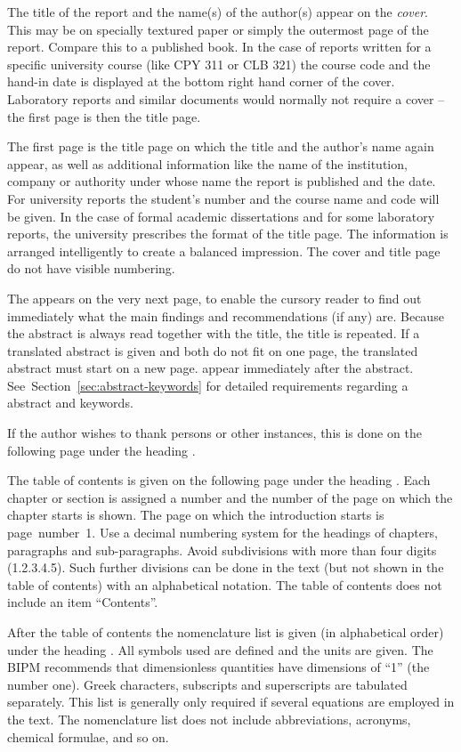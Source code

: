 \documentclass[a5paper, 10pt]{article}
\begin{document}
The title of the report and the name(s) of the author(s) appear on the
\emph{cover}. This may be on specially textured paper or simply the
outermost page of the report.  Compare this to a published book.  In
the case of reports written for a specific university course (like CPY
311 or CLB 321) the course code and the hand-in date is displayed at
the bottom right hand corner of the cover.  Laboratory reports and
similar documents would normally not require a cover -- the first page
is then the title page.

The first page is the title page on which the title and the author's
name again appear, as well as additional information like the name of
the institution, company or authority under whose name the report is
published and the date.  For university reports the student's number
and the course name and code will be given.  In the case of formal
academic dissertations and for some laboratory reports, the university
prescribes the format of the title page.  The information is arranged
intelligently to create a balanced impression.  The cover and title
page do not have visible numbering.

The  appears on the very next page, to enable
the cursory reader to find out immediately what the main findings and
recommendations (if any) are.  Because the abstract is always read
together with the title, the title is repeated.  If a translated
abstract is given and both do not fit on one page, the translated
abstract must start on a new page.
 appear immediately after
the abstract.  See~Section~\ref{sec:abstract-keywords} for detailed
requirements regarding a abstract and keywords.

If the author wishes to thank persons or other instances, this is done
on the following page under the
heading .

The table of contents is given on the following page under the heading
.  Each chapter or section is assigned a number and the number
of the page on which the chapter starts is shown.  The page on which
the introduction starts is page~number~1.  Use a decimal numbering
system for the headings of chapters, paragraphs and sub-paragraphs.
Avoid subdivisions with more than four digits (1.2.3.4.5).  Such
further divisions can be done in the text (but not shown in the table
of contents) with an alphabetical notation. The table of contents does
not include an item ``Contents''.

After the table of contents the nomenclature list is given (in
alphabetical order) under the heading .  All
symbols used are defined and the units are given.
The BIPM recommends that dimensionless quantities have dimensions of ``1'' (the
number one).
Greek
characters, subscripts and superscripts are tabulated separately.
This list is generally only required if several equations are employed
in the text.  The nomenclature list does not include abbreviations,
acronyms, chemical formulae, and so on.
\end{document}

